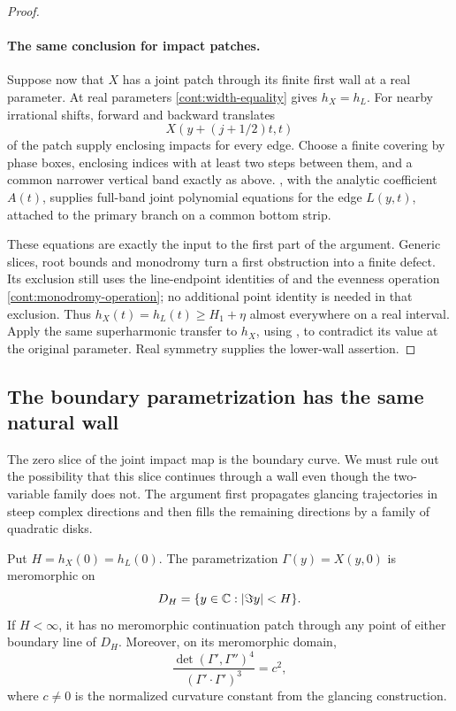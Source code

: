 \begin{proof}
\paragraph{The same conclusion for impact patches.}
Suppose now that \(X\) has a joint patch through its
finite first wall at a real parameter.  At real
parameters \eqref{cont:width-equality} gives \(h_X=h_L\).
For nearby irrational shifts, forward and backward
translates
\[
 X(y+(j+1/2)t,t)
\]
of the patch supply enclosing impacts for every edge.
Choose a finite covering by phase boxes, enclosing indices
with at least two steps between them, and a common
narrower vertical band exactly as above.
, with the analytic coefficient
\(A(t)\), supplies full-band joint polynomial equations
for the edge \(L(y,t)\), attached to the primary branch
on a common bottom strip.

These equations are exactly the input to the first part
of the argument.  Generic slices, root bounds and
monodromy turn a first obstruction into a finite defect.
Its exclusion still uses the line-endpoint identities of
 and the evenness operation
\eqref{cont:monodromy-operation}; no additional point
identity is needed in that exclusion.  Thus
\(h_X(t)=h_L(t)\ge H_1+\eta\) almost everywhere on a
real interval.  Apply the same superharmonic transfer to
\(h_X\), using , to
contradict its value at the original parameter.
Real symmetry supplies the lower-wall assertion.
\end{proof}

\subsection{The boundary parametrization has the same natural wall}

The zero slice of the joint impact map is the boundary curve.
We must rule out the possibility that this slice continues
through a wall even though the two-variable family does not.
The argument first propagates glancing trajectories in steep
complex directions and then fills the remaining directions
by a family of quadratic disks.

\begin{corollary}
\label{cor:shape-natural-boundary}
Put \(H=h_X(0)=h_L(0)\).  The parametrization
\(\Gamma(y)=X(y,0)\) is meromorphic on
\[
 D_H=\{y\in\mathbb C:|\Im y|<H\}.
\]
If \(H<\infty\), it has no meromorphic continuation patch
through any point of either boundary line of \(D_H\).
Moreover, on its meromorphic domain,
\begin{equation}
 \frac{\det(\Gamma',\Gamma'')^4}
      {(\Gamma'\cdot\Gamma')^3}=c^2,
 \label{cont:intrinsic-normalization}
\end{equation}
where \(c\ne0\) is the normalized curvature constant from
the glancing construction.
\end{corollary}

